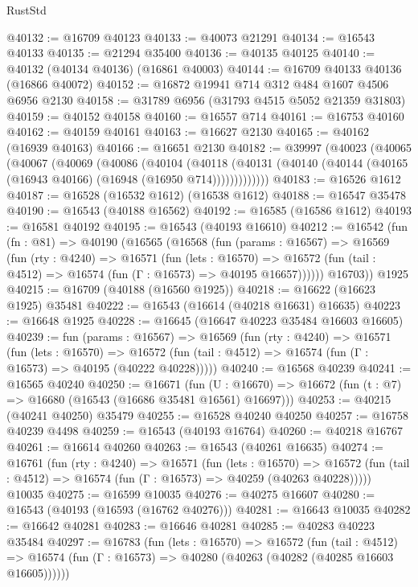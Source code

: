 \begin{lexlean}{RustStd}
\begin{coremodule}
@40132 := @16709 @40123
@40133 := @40073 @21291
@40134 := @16543 @40133
@40135 := @21294 @35400
@40136 := @40135 @40125
@40140 := @40132 (@40134 @40136) (@16861 @40003)
@40144 := @16709 @40133 @40136 (@16866 @40072)
@40152 := @16872 @19941 @714 @312 @484 @1607 @4506 @6956 @2130
@40158 := @31789 @6956 (@31793 @4515 @5052 @21359 @31803)
@40159 := @40152 @40158
@40160 := @16557 @714
@40161 := @16753 @40160
@40162 := @40159 @40161
@40163 := @16627 @2130
@40165 := @40162 (@16939 @40163)
@40166 := @16651 @2130
@40182 := @39997
    (@40023
      (@40065
        (@40067
          (@40069
            (@40086
              (@40104
                (@40118
                  (@40131 (@40140 (@40144 (@40165 (@16943 @40166) (@16948 (@16950 @714)))))))))))))
@40183 := @16526 @1612
@40187 := @16528 (@16532 @1612) (@16538 @1612)
@40188 := @16547 @35478
@40190 := @16543 (@40188 @16562)
@40192 := @16585 (@16586 @1612)
@40193 := @16581 @40192
@40195 := @16543 (@40193 @16610)
@40212 := @16542
    (fun (fn : @81) =>
    @40190
      (@16565
        (@16568
          (fun (params : @16567) =>
          @16569
            (fun (rty : @4240) =>
            @16571
              (fun (lets : @16570) =>
              @16572 (fun (tail : @4512) => @16574 (fun (Γ : @16573) => @40195 @16657))))))
        @16703))
    @1925
@40215 := @16709 (@40188 (@16560 @1925))
@40218 := @16622 (@16623 @1925) @35481
@40222 := @16543 (@16614 (@40218 @16631) @16635)
@40223 := @16648 @1925
@40228 := @16645 (@16647 @40223 @35484 @16603 @16605)
@40239 := fun (params : @16567) =>
  @16569
    (fun (rty : @4240) =>
    @16571
      (fun (lets : @16570) =>
      @16572 (fun (tail : @4512) => @16574 (fun (Γ : @16573) => @40195 (@40222 @40228)))))
@40240 := @16568 @40239
@40241 := @16565 @40240
@40250 := @16671
    (fun (U : @16670) => @16672 (fun (t : @7) => @16680 (@16543 (@16686 @35481 @16561) @16697)))
@40253 := @40215 (@40241 @40250) @35479
@40255 := @16528 @40240 @40250
@40257 := @16758 @40239 @4498
@40259 := @16543 (@40193 @16764)
@40260 := @40218 @16767
@40261 := @16614 @40260
@40263 := @16543 (@40261 @16635)
@40274 := @16761
    (fun (rty : @4240) =>
    @16571
      (fun (lets : @16570) =>
      @16572 (fun (tail : @4512) => @16574 (fun (Γ : @16573) => @40259 (@40263 @40228)))))
    @10035
@40275 := @16599 @10035
@40276 := @40275 @16607
@40280 := @16543 (@40193 (@16593 (@16762 @40276)))
@40281 := @16643 @10035
@40282 := @16642 @40281
@40283 := @16646 @40281
@40285 := @40283 @40223 @35484
@40297 := @16783
    (fun (lets : @16570) =>
    @16572
      (fun (tail : @4512) =>
      @16574 (fun (Γ : @16573) => @40280 (@40263 (@40282 (@40285 @16603 @16605))))))

\end{coremodule}
\end{lexlean}

